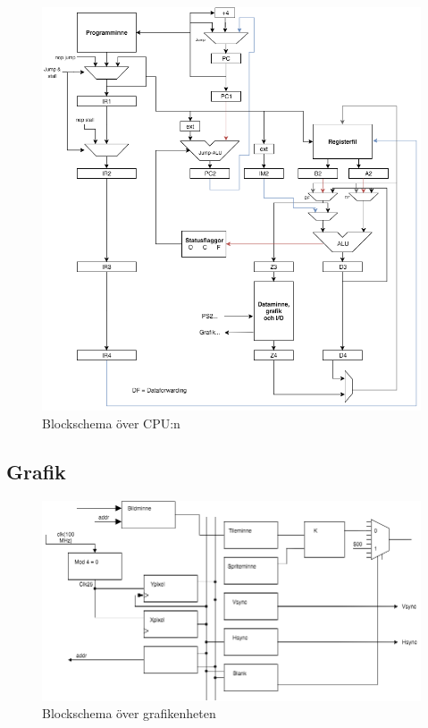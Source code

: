 \documentclass[a4paper,titlepage]{article}
\begin{document}
\begin{figure}[H]
	\centering
\includegraphics[width=14cm]{../images/CPU.png}
\caption{Blockschema över CPU:n\label{cpuscheme}}
\end{figure}

\subsection{Grafik}


\begin{figure}[H]
	\centering
\includegraphics[width=14cm]{../images/vga-schema.png}
	\caption{Blockschema över grafikenheten\label{graphicsscheme}}
\end{figure}
\end{document}
